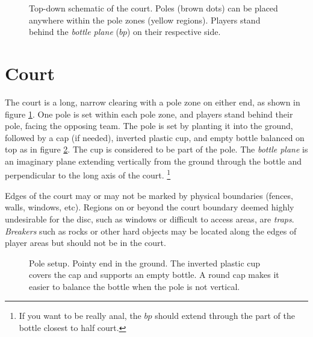 \documentclass[11pt,letterpaper,twocolumn,english,DIV=calc]{scrartcl}
\begin{document}
\begin{figure}[!t]
	\begin{centering}
		\vspace{-5mm}\par
	\end{centering}
	\caption{
		Top-down schematic of the court. 
		Poles (brown dots) can be placed anywhere within the pole zones (yellow regions). 
		Players stand behind the \emph{bottle plane} ($bp$) on their respective side.\label{fig:court}
	}
\end{figure}


\part*{Court}

The court is a long, narrow clearing with a pole zone on either end, as shown in figure \ref{fig:court}. 
One pole is set within each pole zone, and players stand behind their pole, facing the opposing team.
The pole is set by planting it into the ground, followed by a cap (if needed), inverted plastic cup, and empty bottle balanced on top as in figure \ref{fig:pole-setup}. 
The cup is considered to be part of the pole. 
The \emph{bottle plane} is an imaginary plane extending vertically from the ground through the bottle and perpendicular to the long axis of the court.%
\footnote{If you want to be really anal, the $bp$ should extend through the part of the bottle closest to half court.}

Edges of the court may or may not be marked by physical boundaries (fences, walls, windows, etc). 
Regions on or beyond the court boundary deemed highly undesirable for the disc, such as windows or difficult to access areas, are \emph{traps}. 
\emph{Breakers} such as rocks or other hard objects may be located along the edges of player areas but should not be in the court.

\begin{figure}[!ht]
	\begin{centering}
		\vspace{-5mm}\par
	\end{centering}
	\caption{
		Pole setup. 
		Pointy end in the ground. 
		The inverted plastic cup covers the cap and supports an empty bottle. 
		A round cap makes it easier to balance the bottle when the pole is not vertical.\label{fig:pole-setup}
	}
\end{figure}
\end{document}
